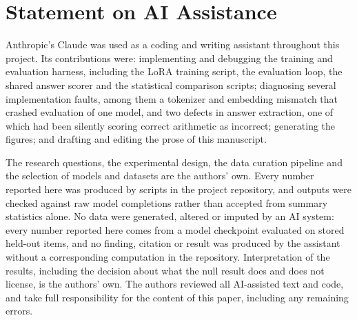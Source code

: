 \section*{Statement on AI Assistance}

Anthropic's Claude was used as a coding and writing assistant throughout this
project. Its contributions were: implementing and debugging the training and
evaluation harness, including the LoRA training script, the evaluation loop,
the shared answer scorer and the statistical comparison scripts; diagnosing
several implementation faults, among them a tokenizer and embedding mismatch
that crashed evaluation of one model, and two defects in answer extraction, one
of which had been silently scoring correct arithmetic as incorrect; generating
the figures; and drafting and editing the prose of this manuscript.

The research questions, the experimental design, the data curation pipeline and
the selection of models and datasets are the authors' own. Every number
reported here was produced by scripts in the project repository, and outputs
were checked against raw model completions rather than accepted from summary
statistics alone. No data were generated, altered or imputed by an AI system: every number
reported here comes from a model checkpoint evaluated on stored held-out items,
and no finding, citation or result was produced by the assistant without a
corresponding computation in the repository. Interpretation of the results,
including the decision about what the null result does and does not license, is
the authors' own. The authors reviewed all AI-assisted text and code, and take
full responsibility for the content of this paper, including any remaining
errors.
